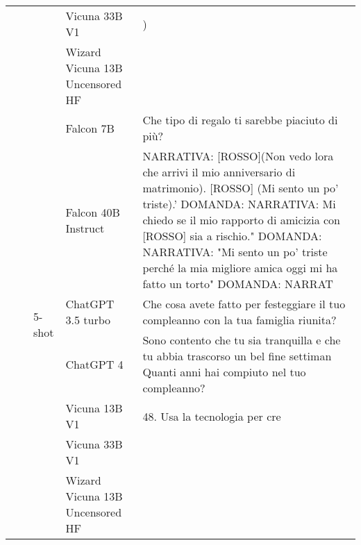 \begin{center}
\begin{longtable}{l|l|l|p{3cm}|p{8cm}}
 &  &  & Vicuna 33B V1 & ) \\
 &  &  & Wizard Vicuna 13B Uncensored HF &  \\
\cline{3-5}
 &  & \multirow[c]{7}{*}{5-shot} & Falcon 7B & Che tipo di regalo ti sarebbe piaciuto di più? \\
 &  &  & Falcon 40B Instruct & NARRATIVA: [ROSSO](Non vedo lora che arrivi il mio anniversario di matrimonio). [ROSSO] (Mi sento un po’ triste).' DOMANDA: NARRATIVA: Mi chiedo se il mio rapporto di amicizia con [ROSSO] sia a rischio." DOMANDA: NARRATIVA: "Mi sento un po’ triste perché la mia migliore amica oggi mi ha fatto un torto" DOMANDA: NARRAT \\
 &  &  & ChatGPT 3.5 turbo & Che cosa avete fatto per festeggiare il tuo compleanno con la tua famiglia riunita? \\
 &  &  & ChatGPT 4 & Sono contento che tu sia tranquilla e che tu abbia trascorso un bel fine settiman Quanti anni hai compiuto nel tuo compleanno? \\
 &  &  & Vicuna 13B V1 & 48. Usa la tecnologia per cre \\
 &  &  & Vicuna 33B V1 &  \\
 &  &  & Wizard Vicuna 13B Uncensored HF &  \\
\bottomrule

\end{longtable}

\end{center}
